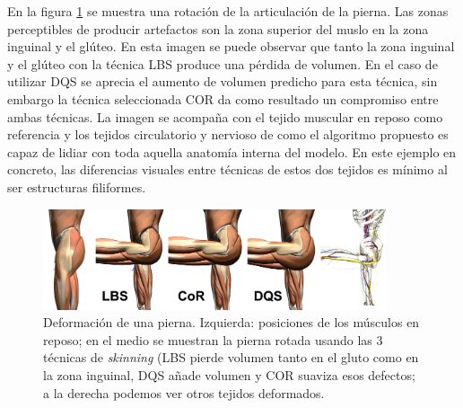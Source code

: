 En la figura \ref{fig:thigh_bending} se muestra una rotación de la articulación de la pierna. Las zonas perceptibles de producir artefactos son la zona superior del muslo en la zona inguinal y el glúteo. En esta imagen se puede observar que tanto la zona inguinal y el glúteo con la técnica \ac{LBS} produce una pérdida de volumen. En el caso de utilizar \ac{DQS} se aprecia el aumento de volumen predicho para esta técnica, sin embargo la técnica seleccionada \ac{COR} da como resultado un compromiso entre ambas técnicas. La imagen se acompaña con el tejido muscular en reposo como referencia y los tejidos circulatorio y nervioso de como el algoritmo propuesto es capaz de lidiar con toda aquella anatomía interna del modelo. En este ejemplo en concreto, las diferencias visuales entre técnicas de estos dos tejidos es mínimo al ser estructuras filiformes. 





\begin{figure}[h]%
  \centering
  \includegraphics[width=0.90\textwidth]{IMG/compculo}
    \caption{ Deformación de una pierna. Izquierda: posiciones de los músculos en reposo; en el medio se muestran la pierna rotada usando las 3 técnicas de \emph{skinning} (\ac{LBS} pierde volumen tanto en el gluto como en la zona inguinal, \ac{DQS} añade volumen y \ac{COR} suaviza esos defectos; a la derecha podemos ver otros tejidos deformados.}
    \label{fig:thigh_bending}
\end{figure}


